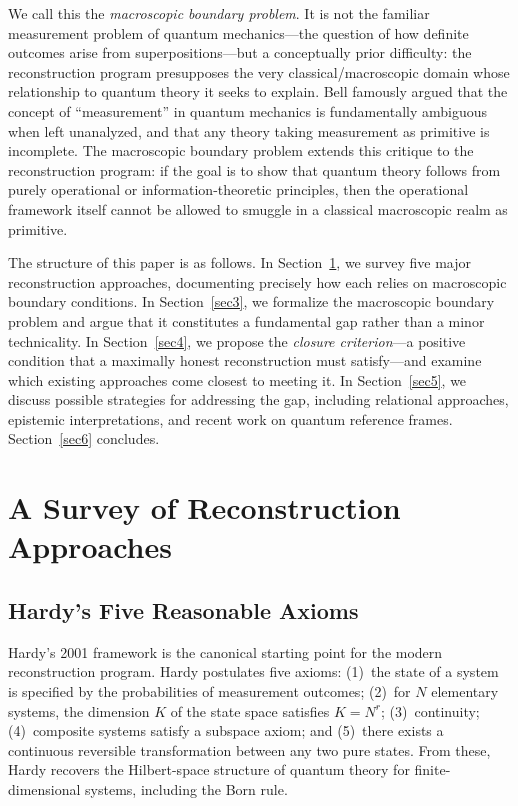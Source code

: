 \documentclass[pdflatex,sn-mathphys-num]{sn-jnl}%
\begin{document}
We call this the \emph{macroscopic boundary problem}. It is not the familiar measurement problem of quantum mechanics---the question of how definite outcomes arise from superpositions---but a conceptually prior difficulty: the reconstruction program presupposes the very classical/macroscopic domain whose relationship to quantum theory it seeks to explain. Bell \cite{Bell1990} famously argued that the concept of ``measurement'' in quantum mechanics is fundamentally ambiguous when left unanalyzed, and that any theory taking measurement as primitive is incomplete. The macroscopic boundary problem extends this critique to the reconstruction program: if the goal is to show that quantum theory follows from purely operational or information-theoretic principles, then the operational framework itself cannot be allowed to smuggle in a classical macroscopic realm as primitive.

The structure of this paper is as follows. In Section~\ref{sec2}, we survey five major reconstruction approaches, documenting precisely how each relies on macroscopic boundary conditions. In Section~\ref{sec3}, we formalize the macroscopic boundary problem and argue that it constitutes a fundamental gap rather than a minor technicality. In Section~\ref{sec4}, we propose the \emph{closure criterion}---a positive condition that a maximally honest reconstruction must satisfy---and examine which existing approaches come closest to meeting it. In Section~\ref{sec5}, we discuss possible strategies for addressing the gap, including relational approaches, epistemic interpretations, and recent work on quantum reference frames. Section~\ref{sec6} concludes.

\section{A Survey of Reconstruction Approaches}\label{sec2}

\subsection{Hardy's Five Reasonable Axioms}

Hardy's 2001 framework \cite{Hardy2001} is the canonical starting point for the modern reconstruction program. Hardy postulates five axioms: (1)~the state of a system is specified by the probabilities of measurement outcomes; (2)~for $N$ elementary systems, the dimension $K$ of the state space satisfies $K = N^r$; (3)~continuity; (4)~composite systems satisfy a subspace axiom; and (5)~there exists a continuous reversible transformation between any two pure states. From these, Hardy recovers the Hilbert-space structure of quantum theory for finite-dimensional systems, including the Born rule.
\end{document}
